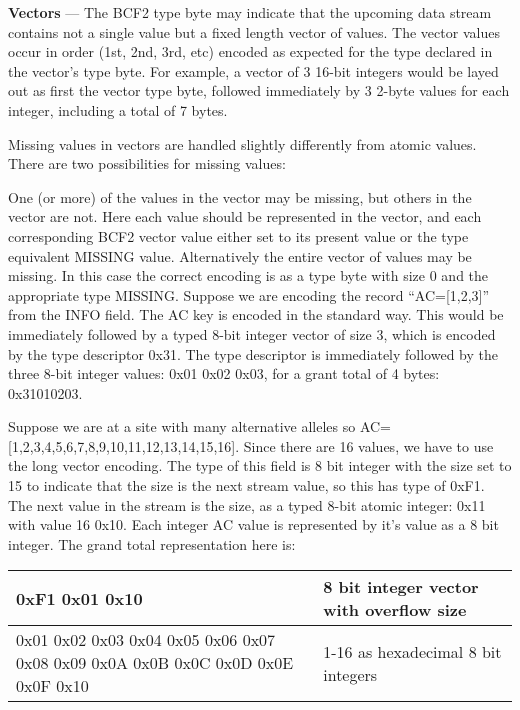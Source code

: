 \documentclass[8pt]{article}
\begin{document}
\vspace{0.3cm}

\textbf{Vectors} --- The BCF2 type byte may indicate that the upcoming data stream contains not a single value but a fixed length vector of values.  The vector values occur in order (1st, 2nd, 3rd, etc) encoded as expected for the type declared in the vector's type byte.  For example, a vector of 3 16-bit integers would be layed out as first the vector type byte, followed immediately by 3 2-byte values for each integer, including a total of 7 bytes.

Missing values in vectors are handled slightly differently from atomic values.  There are two possibilities for missing values:

One (or more) of the values in the vector may be missing, but others in the vector are not.  Here each value should be represented in the vector, and each corresponding BCF2 vector value either set to its present value or the type equivalent MISSING value.
Alternatively the entire vector of values may be missing.  In this case the correct encoding is as a type byte with size 0 and the appropriate type MISSING.
Suppose we are encoding the record ``AC=[1,2,3]'' from the INFO field.  The AC key is encoded in the standard way.  This would be immediately followed by a typed 8-bit integer vector of size 3, which is encoded by the type descriptor 0x31.  The type descriptor is immediately followed by the three 8-bit integer values: 0x01 0x02 0x03, for a grant total of 4 bytes: 0x31010203.

Suppose we are at a site with many alternative alleles so AC=[1,2,3,4,5,6,7,8,9,10,11,12,13,14,15,16].  Since there are 16 values, we have to use the long vector encoding.  The type of this field is 8 bit integer with the size set to 15 to indicate that the size is the next stream value, so this has type of 0xF1.  The next value in the stream is the size, as a typed 8-bit atomic integer: 0x11 with value 16 0x10.  Each integer AC value is represented by it's value as a 8 bit integer.  The grand total representation here is:

\vspace{0.3cm}
\begin{tabular}{|p{9cm} | p{6cm}|} \hline
0xF1 0x01 0x10 & 8 bit integer vector with overflow size \\ \hline
0x01 0x02 0x03 0x04 0x05 0x06 0x07 0x08 0x09 0x0A 0x0B 0x0C 0x0D 0x0E 0x0F 0x10 & 1-16 as hexadecimal 8 bit integers \\ \hline
\end{tabular}
\vspace{0.3cm}
\end{document}
